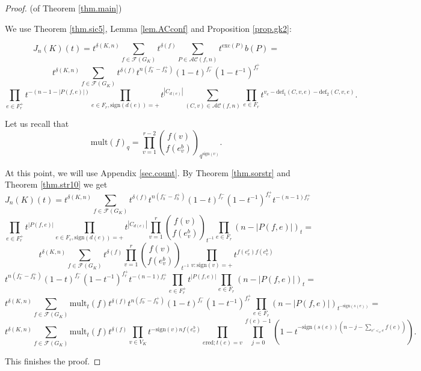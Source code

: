 \documentclass{amsart}
\theoremstyle{plain}
\theoremstyle{definition}
\theoremstyle{remark}
\def\C{\mathcal C}
\def\F{\mathcal F}
\def\AC{\mathcal{AC}}
\def\d{\delta}
\def\b{\beta}
\def\sign{\mathrm{sign}}
\def\exc{\mathrm{exc}}
\def\mult{\mathrm{mult}}
\def\defect{\mathrm{def}}
\begin{document}
\begin{proof}(of Theorem \ref{thm.main})

We use Theorem \ref{thm.sic5}, Lemma \ref{lem.ACconf} and 
Proposition \ref{prop.gk2}:

$$
J_n(K)(t) = t^{\d(K,n)}
\sum_{f\in \F(G_K)}
t^{\d(f)}\sum_{P\in \AC(f,n)}t^{\exc(P)}b(P)=
$$
$$
t^{\d(K,n)}\sum_{f\in \F(G_K)}t^{\d(f)}
t^{n(f^-_b-f^+_b)}(1-t)^{f^-_r}(1-t^{-1})^{f^+_r}
$$
$$
 \prod_{e\in F^+_r} t^{-(n-1-|P(f,e)|)}
\prod_{e\in F_r, \sign(d(e))=+}t^{|C_{d(e)}|}
\sum_{(C,v) \in \AC(f,n)}\prod_{e\in F_r} t^{v_e-\defect_1(C,v,e)-
\defect_2(C,v,e)}.
$$



Let us recall that
$$
\mult(f)_{q}= \prod_{v=1}^{r-2}\binom{f(v)}{f(e^b_v)}_{q^{\sign(v)}}.
$$

At this point, we will use Appendix \ref{sec.count}. By Theorem 
\ref{thm.sorstr} and 
Theorem \ref{thm.str10} we get 
$$
J_n(K)(t) = t^{\d(K,n)}
\sum_{f\in \F(G_K)}t^{\d(f)}
t^{n(f^-_b-f^+_b)}(1-t)^{f^-_r}(1-t^{-1})^{f^+_r}  t^{-(n-1)f^+_r} 
$$
$$
\prod_{e\in F^+_r} t^{|P(f,e)|}\prod_{e\in F_r, \sign(d(e))=+}t^{|C_{d(e)}|}
 \prod_{v=1}^{r}\binom{f(v)}{f(e^b_v)}_{t^{-1}} 
\prod_{e\in F_r}(n-|P(f,e)|)_t =
$$
$$
t^{\d(K,n)}\sum_{f\in \F(G_K)}t^{\d(f)}\prod_{v=1}^{r}
\binom{f(v)}{f(e^b_v)}_{t^{-1}}
\prod_{v:\sign(v)=+}t^{f(e^r_v)f(e^b_v)}
$$
$$
t^{n(f^-_b-f^+_b)}(1-t)^{f^-_r}(1-t^{-1})^{f^+_r}  t^{-(n-1)f^+_r}
\prod_{e\in F^+_r} t^{|P(f,e)|}
\prod_{e\in F_r}(n-|P(f,e)|)_t  =
$$
$$
t^{\d(K,n)}\sum_{f\in \F(G_K)}\mult_{t}(f)t^{\d(f)}t^{n(f^-_b-f^+_b)} 
(1-t)^{f^-_r}(1-t^{-1})^{f^+_r} 
\prod_{e\in F_r}(n-|P(f,e)|)_{t^{-\sign(s(e))}}=
$$
$$
t^{\d(K,n)}\sum_{f\in \F(G_K)}\mult_{t}(f)
t^{\d(f)} \prod_{v \in V_K} t^{-\sign(v)nf(e^b_v)}
\prod_{e \text{red};t(e)=v}\prod_{j=0}^{f(e)-1} 
(1-t^{-\sign(s(e))(n- j- \sum_{e'<_v e}f(e))}).  
$$




This finishes the proof.
\end{proof}
\end{document}
